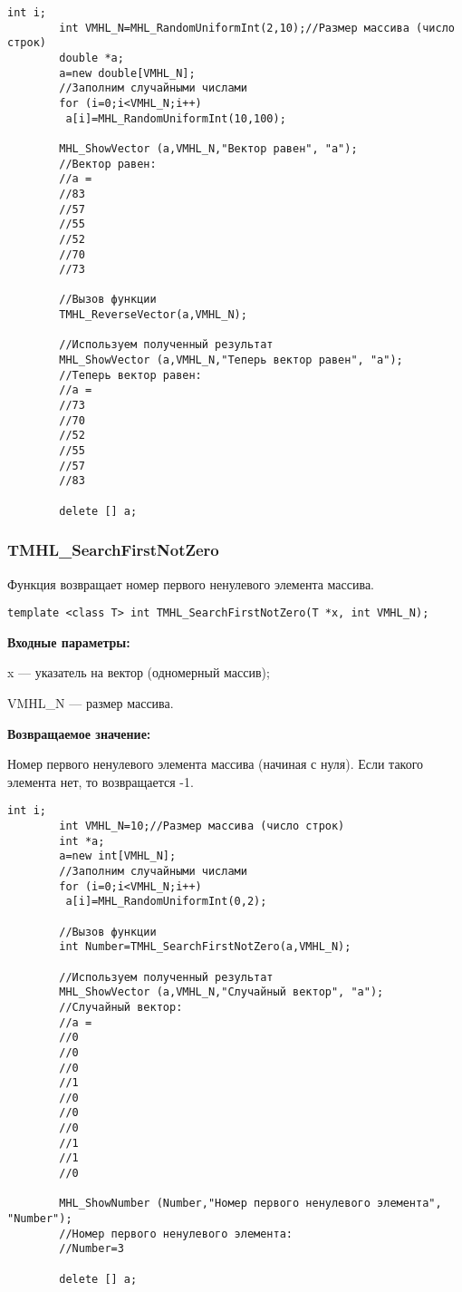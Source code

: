 \documentclass[a4paper,12pt]{article}
\begin{document}
\begin{lstlisting}[label=code_use_TMHL_ReverseVector,caption=Пример использования]
        int i;
        int VMHL_N=MHL_RandomUniformInt(2,10);//Размер массива (число строк)
        double *a;
        a=new double[VMHL_N];
        //Заполним случайными числами
        for (i=0;i<VMHL_N;i++)
         a[i]=MHL_RandomUniformInt(10,100);

        MHL_ShowVector (a,VMHL_N,"Вектор равен", "a");
        //Вектор равен:
        //a =
        //83
        //57
        //55
        //52
        //70
        //73

        //Вызов функции
        TMHL_ReverseVector(a,VMHL_N);

        //Используем полученный результат
        MHL_ShowVector (a,VMHL_N,"Теперь вектор равен", "a");
        //Теперь вектор равен:
        //a =
        //73
        //70
        //52
        //55
        //57
        //83

        delete [] a;
\end{lstlisting}

\subsubsection{TMHL\_SearchFirstNotZero}\label{TMHL_SearchFirstNotZero}

Функция возвращает номер первого ненулевого элемента массива.


\begin{lstlisting}[label=code_syntax_TMHL_SearchFirstNotZero,caption=Синтаксис]
template <class T> int TMHL_SearchFirstNotZero(T *x, int VMHL_N);
\end{lstlisting}

\textbf{Входные параметры:}

 x --- указатель на вектор (одномерный массив);
 
 VMHL\_N --- размер массива.

\textbf{Возвращаемое значение:}

Номер первого ненулевого элемента массива (начиная с нуля). Если такого элемента нет, то возвращается -1.


\begin{lstlisting}[label=code_use_TMHL_SearchFirstNotZero,caption=Пример использования]
        int i;
        int VMHL_N=10;//Размер массива (число строк)
        int *a;
        a=new int[VMHL_N];
        //Заполним случайными числами
        for (i=0;i<VMHL_N;i++)
         a[i]=MHL_RandomUniformInt(0,2);

        //Вызов функции
        int Number=TMHL_SearchFirstNotZero(a,VMHL_N);

        //Используем полученный результат
        MHL_ShowVector (a,VMHL_N,"Случайный вектор", "a");
        //Случайный вектор:
        //a =
        //0
        //0
        //0
        //1
        //0
        //0
        //0
        //1
        //1
        //0

        MHL_ShowNumber (Number,"Номер первого ненулевого элемента", "Number");
        //Номер первого ненулевого элемента:
        //Number=3

        delete [] a;
\end{lstlisting}
\end{document}
